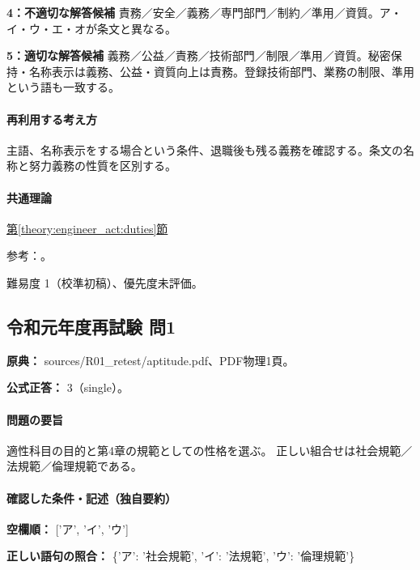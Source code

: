 \noindent\textbf{4：不適切な解答候補} 責務／安全／義務／専門部門／制約／準用／資質。ア・イ・ウ・エ・オが条文と異なる。\par

\noindent\textbf{5：適切な解答候補} 義務／公益／責務／技術部門／制限／準用／資質。秘密保持・名称表示は義務、公益・資質向上は責務。登録技術部門、業務の制限、準用という語も一致する。\par

\paragraph{再利用する考え方} 主語、名称表示をする場合という条件、退職後も残る義務を確認する。条文の名称と努力義務の性質を区別する。

\paragraph{共通理論} \hyperref[theory:engineer_act:duties]{第\ref*{theory:engineer_act:duties}節}

\par 参考：\cite{engineer_act_current}。

\par 難易度 1（校準初稿）、優先度未評価。

\subsection{令和元年度再試験 問1}
\label{q:r01-ret-apt-01}

\noindent\textbf{原典：} sources/R01\_retest/aptitude.pdf、PDF物理1頁。

\textbf{公式正答：} 3（single）。

\paragraph{問題の要旨} 適性科目の目的と第4章の規範としての性格を選ぶ。 正しい組合せは社会規範／法規範／倫理規範である。

\paragraph{確認した条件・記述（独自要約）}\mbox{}\par

\noindent\textbf{空欄順：} ['ア', 'イ', 'ウ']\par

\noindent\textbf{正しい語句の照合：} \{'ア': '社会規範', 'イ': '法規範', 'ウ': '倫理規範'\}\par

